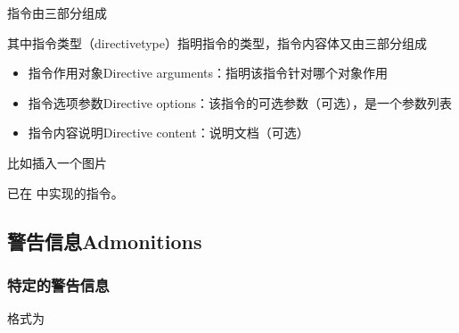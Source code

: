 \documentclass[a4paper,10pt,english]{sphinxmanual}
\begin{document}
\sphinxAtStartPar
指令由三部分组成

\begin{sphinxVerbatim}[commandchars=\\\{\}]
  
\end{sphinxVerbatim}

\sphinxAtStartPar
其中指令类型（directive\sphinxhyphen{}type）指明指令的类型，指令内容体又由三部分组成
\begin{itemize}
\item {} 
\sphinxAtStartPar
指令作用对象Directive arguments：指明该指令针对哪个对象作用

\item {} 
\sphinxAtStartPar
指令选项参数Directive options：该指令的可选参数（可选），是一个参数列表

\item {} 
\sphinxAtStartPar
指令内容说明Directive content：说明文档（可选）

\end{itemize}

\sphinxAtStartPar
比如插入一个图片

\begin{sphinxVerbatim}[commandchars=\\\{\}]
    
         
    

      
\end{sphinxVerbatim}

\sphinxAtStartPar
已在  中实现的指令。


\subsection{警告信息Admonitions}
\label{\detokenize{reStructureText_syntax:admonitions}}

\subsubsection{特定的警告信息}
\label{\detokenize{reStructureText_syntax:id40}}
\sphinxAtStartPar
格式为
\end{document}
